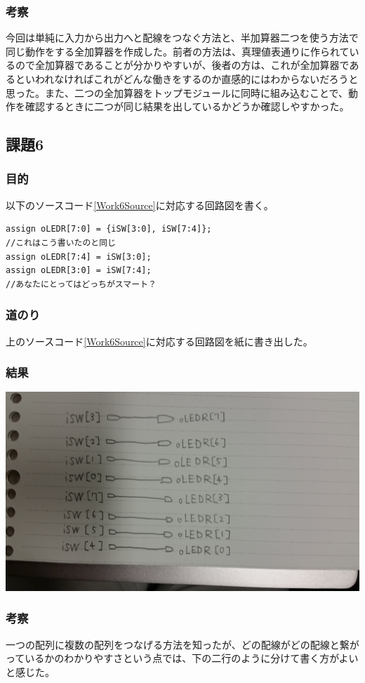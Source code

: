 \documentclass[a4paper]{jarticle}
\begin{document}
\subsubsection{考察}
今回は単純に入力から出力へと配線をつなぐ方法と、半加算器二つを使う方法で同じ動作をする全加算器を作成した。前者の方法は、真理値表通りに作られているので全加算器であることが分かりやすいが、後者の方は、これが全加算器であるといわれなければこれがどんな働きをするのか直感的にはわからないだろうと思った。また、二つの全加算器をトップモジュールに同時に組み込むことで、動作を確認するときに二つが同じ結果を出しているかどうか確認しやすかった。
\subsection{課題6}
\subsubsection{目的}
以下のソースコード\ref{Work6Source}に対応する回路図を書く。
\begin{lstlisting}[caption=信号を束ねる例,label=Work6Source]
assign oLEDR[7:0] = {iSW[3:0], iSW[7:4]};
//これはこう書いたのと同じ
assign oLEDR[7:4] = iSW[3:0];
assign oLEDR[3:0] = iSW[7:4];
//あなたにとってはどっちがスマート？
\end{lstlisting}
\subsubsection{道のり}
上のソースコード\ref{Work6Source}に対応する回路図を紙に書き出した。
\subsubsection{結果}
\includegraphics[width=15cm]{work6/CircuitDiagram.jpg}
\subsubsection{考察}
一つの配列に複数の配列をつなげる方法を知ったが、どの配線がどの配線と繋がっているかのわかりやすさという点では、下の二行のように分けて書く方がよいと感じた。
\end{document}
